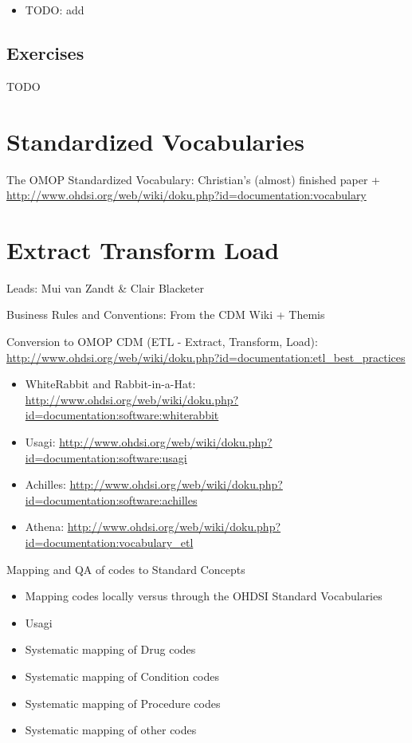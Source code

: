 \documentclass[11pt]{book}
\providecommand{\tightlist}{%
  \setlength{\itemsep}{0pt}\setlength{\parskip}{0pt}}
\theoremstyle{definition}
\theoremstyle{definition}
\theoremstyle{definition}
\theoremstyle{remark}
\let\BeginKnitrBlock\begin \let\EndKnitrBlock\end
\begin{document}
\BeginKnitrBlock{rmdsummary}
\begin{itemize}
\tightlist
\item
  TODO: add
\end{itemize}
\EndKnitrBlock{rmdsummary}

\hypertarget{exercises}{%
\section{Exercises}\label{exercises}}

TODO

\hypertarget{StandardizedVocabularies}{%
\chapter{Standardized Vocabularies}\label{StandardizedVocabularies}}

The OMOP Standardized Vocabulary: Christian's (almost) finished paper + \url{http://www.ohdsi.org/web/wiki/doku.php?id=documentation:vocabulary}

\hypertarget{ExtractTransformLoad}{%
\chapter{Extract Transform Load}\label{ExtractTransformLoad}}

Leads: Mui van Zandt \& Clair Blacketer

Business Rules and Conventions: From the CDM Wiki + Themis

Conversion to OMOP CDM (ETL - Extract, Transform, Load): \url{http://www.ohdsi.org/web/wiki/doku.php?id=documentation:etl_best_practices}

\begin{itemize}
\tightlist
\item
  WhiteRabbit and Rabbit-in-a-Hat: \url{http://www.ohdsi.org/web/wiki/doku.php?id=documentation:software:whiterabbit}
\item
  Usagi: \url{http://www.ohdsi.org/web/wiki/doku.php?id=documentation:software:usagi}
\item
  Achilles: \url{http://www.ohdsi.org/web/wiki/doku.php?id=documentation:software:achilles}
\item
  Athena: \url{http://www.ohdsi.org/web/wiki/doku.php?id=documentation:vocabulary_etl}
\end{itemize}

Mapping and QA of codes to Standard Concepts

\begin{itemize}
\tightlist
\item
  Mapping codes locally versus through the OHDSI Standard Vocabularies
\item
  Usagi
\item
  Systematic mapping of Drug codes
\item
  Systematic mapping of Condition codes
\item
  Systematic mapping of Procedure codes
\item
  Systematic mapping of other codes
\end{itemize}
\end{document}
